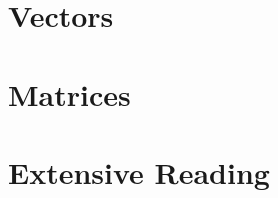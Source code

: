 \ifdefined\printmath

\part{Vectors}







\part{Matrices}





\part{Extensive Reading}



%

%

%

%

%
\fi
